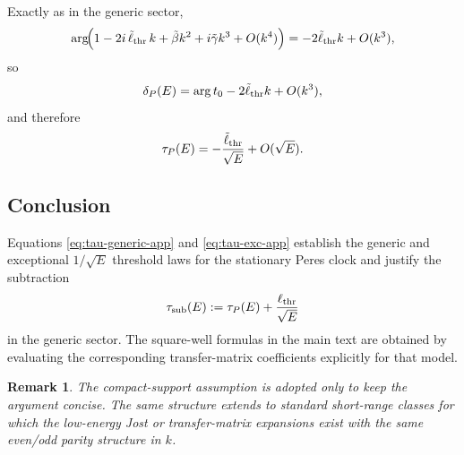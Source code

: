\documentclass[aps,pra,preprint,notitlepage,nofootinbib]{revtex4-2}
\newtheorem{remark}{Remark}
\begin{document}
Exactly as in the generic sector,
\begin{equation}
\arg\!\Bigl(
1-2i\,\tilde\ell_{\rm thr}\,k+\tilde\beta k^2+i\tilde\gamma k^3+O(k^4)
\Bigr)
=
-2\tilde\ell_{\rm thr}k+O(k^3),
\end{equation}
so
\begin{equation}
\delta_P(E)
=
\arg t_0 -2\tilde\ell_{\rm thr}k+O(k^3),
\label{eq:delta-exc-app}
\end{equation}
and therefore
\begin{equation}
\tau_P(E)
=
-\frac{\tilde\ell_{\rm thr}}{\sqrt E}+O(\sqrt E).
\label{eq:tau-exc-app}
\end{equation}

\subsection{Conclusion}

Equations \eqref{eq:tau-generic-app} and \eqref{eq:tau-exc-app} establish the generic and exceptional $1/\sqrt E$ threshold laws for the stationary Peres clock and justify the subtraction
\begin{equation}
\tau_{\rm sub}(E):=
\tau_P(E)+\frac{\ell_{\rm thr}}{\sqrt E}
\label{eq:tau-sub-app}
\end{equation}
in the generic sector. The square-well formulas in the main text are obtained by evaluating the corresponding transfer-matrix coefficients explicitly for that model.

\begin{remark}
The compact-support assumption is adopted only to keep the argument concise. The same structure extends to standard short-range classes for which the low-energy Jost or transfer-matrix expansions exist with the same even/odd parity structure in $k$.
\end{remark}



\end{document}
